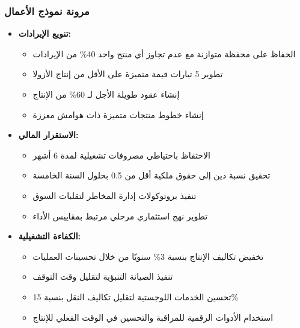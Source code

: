 \subsubsection{مرونة نموذج الأعمال}
\begin{itemize}
    \item \textbf{تنويع الإيرادات:}
    \begin{itemize}
        \item الحفاظ على محفظة متوازنة مع عدم تجاوز أي منتج واحد 40\% من الإيرادات
        \item تطوير 5 تيارات قيمة متميزة على الأقل من إنتاج الأزولا
        \item إنشاء عقود طويلة الأجل لـ 60\% من الإنتاج
        \item إنشاء خطوط منتجات متميزة ذات هوامش معززة
    \end{itemize}
    
    \item \textbf{الاستقرار المالي:}
    \begin{itemize}
        \item الاحتفاظ باحتياطي مصروفات تشغيلية لمدة 6 أشهر
        \item تحقيق نسبة دين إلى حقوق ملكية أقل من 0.5 بحلول السنة الخامسة
        \item تنفيذ بروتوكولات إدارة المخاطر لتقلبات السوق
        \item تطوير نهج استثماري مرحلي مرتبط بمقاييس الأداء
    \end{itemize}
    
    \item \textbf{الكفاءة التشغيلية:}
    \begin{itemize}
        \item تخفيض تكاليف الإنتاج بنسبة 3\% سنويًا من خلال تحسينات العمليات
        \item تنفيذ الصيانة التنبؤية لتقليل وقت التوقف
        \item تحسين الخدمات اللوجستية لتقليل تكاليف النقل بنسبة 15\%
        \item استخدام الأدوات الرقمية للمراقبة والتحسين في الوقت الفعلي للإنتاج
    \end{itemize}
\end{itemize}

